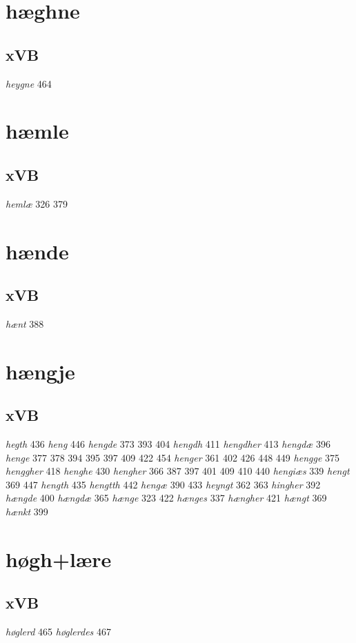 \documentclass[a4paper,twocolumn]{article}
\begin{document}
\section{hæghne}
\label{sec:orgcf766c4}
\subsection{xVB}
\label{sec:orgf0b30d2}
\emph{heygne} 464 
\section{hæmle}
\label{sec:org25e18d1}
\subsection{xVB}
\label{sec:org3d01926}
\emph{hemlæ} 326 379 
\section{hænde}
\label{sec:org9f6ccff}
\subsection{xVB}
\label{sec:orgc292765}
\emph{hænt} 388 
\section{hængje}
\label{sec:orga5a552b}
\subsection{xVB}
\label{sec:org6aed160}
\emph{hegth} 436 \emph{heng} 446 \emph{hengde} 373 393 404 \emph{hengdh} 411 \emph{hengdher} 413 \emph{hengdæ} 396 \emph{henge} 377 378 394 395 397 409 422 454 \emph{henger} 361 402 426 448 449 \emph{hengge} 375 \emph{henggher} 418 \emph{henghe} 430 \emph{hengher} 366 387 397 401 409 410 440 \emph{hengiæs} 339 \emph{hengt} 369 447 \emph{hength} 435 \emph{hengtth} 442 \emph{hengæ} 390 433 \emph{heyngt} 362 363 \emph{hingher} 392 \emph{hængde} 400 \emph{hængdæ} 365 \emph{hænge} 323 422 \emph{hænges} 337 \emph{hængher} 421 \emph{hængt} 369 \emph{hænkt} 399 
\section{høgh+lære}
\label{sec:org88fbd42}
\subsection{xVB}
\label{sec:org1d5f9ca}
\emph{høglerd} 465 \emph{høglerdes} 467 
\end{document}
